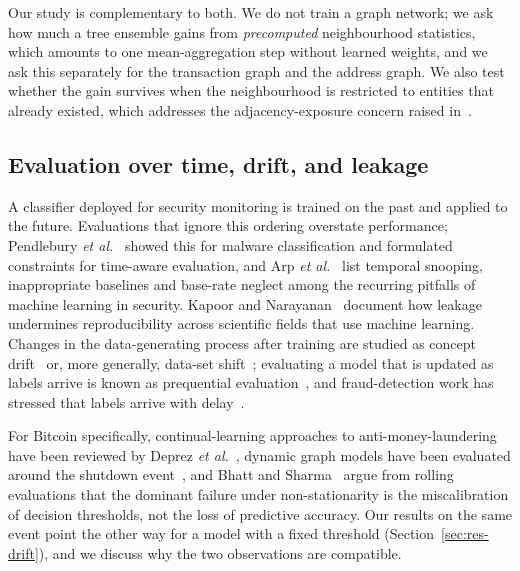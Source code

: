 Our study is complementary to both. We do not train a graph network; we ask how much a tree ensemble gains from \emph{precomputed} neighbourhood statistics, which amounts to one mean-aggregation step without learned weights, and we ask this separately for the transaction graph and the address graph. We also test whether the gain survives when the neighbourhood is restricted to entities that already existed, which addresses the adjacency-exposure concern raised in~\cite{maganti2026}.

\subsection{Evaluation over time, drift, and leakage}
A classifier deployed for security monitoring is trained on the past and applied to the future. Evaluations that ignore this ordering overstate performance; Pendlebury \emph{et al.}~\cite{pendlebury2019} showed this for malware classification and formulated constraints for time-aware evaluation, and Arp \emph{et al.}~\cite{arp2022} list temporal snooping, inappropriate baselines and base-rate neglect among the recurring pitfalls of machine learning in security. Kapoor and Narayanan~\cite{kapoor2023} document how leakage undermines reproducibility across scientific fields that use machine learning. Changes in the data-generating process after training are studied as concept drift~\cite{gama2014} or, more generally, data-set shift~\cite{moreno2012}; evaluating a model that is updated as labels arrive is known as prequential evaluation~\cite{gama2013}, and fraud-detection work has stressed that labels arrive with delay~\cite{dalpozzolo2018}.

For Bitcoin specifically, continual-learning approaches to anti-money-laundering have been reviewed by Deprez \emph{et al.}~\cite{deprez2025}, dynamic graph models have been evaluated around the shutdown event~\cite{kulkarni2025}, and Bhatt and Sharma~\cite{bhatt2026} argue from rolling evaluations that the dominant failure under non-stationarity is the miscalibration of decision thresholds, not the loss of predictive accuracy. Our results on the same event point the other way for a model with a fixed threshold (Section~\ref{sec:res-drift}), and we discuss why the two observations are compatible.

